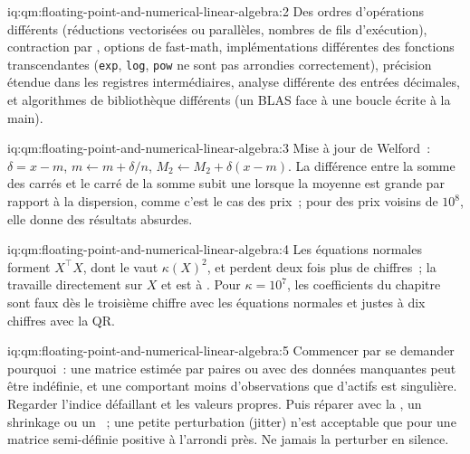 \begin{solution}{iq:qm:floating-point-and-numerical-linear-algebra:2}
Des ordres d'opérations différents (réductions vectorisées ou parallèles, nombres de fils d'exécution), contraction par , options de fast-math, implémentations différentes des fonctions transcendantes (\texttt{exp}, \texttt{log},
\texttt{pow} ne sont pas arrondies correctement), précision étendue dans les registres intermédiaires, analyse différente des entrées décimales, et algorithmes de bibliothèque différents (un BLAS face à une boucle écrite à la main).
\end{solution}

\begin{solution}{iq:qm:floating-point-and-numerical-linear-algebra:3}
Mise à jour de Welford~: $\delta = x - m$, $m \leftarrow m + \delta/n$, $M_2 \leftarrow M_2 + \delta(x - m)$. La différence entre la somme des carrés et le carré de la somme subit une  lorsque la moyenne est grande
par rapport à la dispersion, comme c'est le cas des prix~; pour des prix voisins de $10^8$, elle donne des résultats absurdes.
\end{solution}

\begin{solution}{iq:qm:floating-point-and-numerical-linear-algebra:4}
Les équations normales forment $X^\top X$, dont le  vaut $\kappa(X)^2$, et perdent deux fois plus de chiffres~; la  travaille directement sur $X$ et est à . Pour $\kappa = 10^7$, les coefficients du chapitre
sont faux dès le troisième chiffre avec les équations normales et justes à dix chiffres avec la QR.
\end{solution}

\begin{solution}{iq:qm:floating-point-and-numerical-linear-algebra:5}
Commencer par se demander pourquoi~: une matrice estimée par paires ou avec des données manquantes peut être indéfinie, et une  comportant moins d'observations que d'actifs est singulière. Regarder l'indice défaillant et les
valeurs propres. Puis réparer avec la , un shrinkage ou un ~; une petite perturbation (jitter) n'est acceptable que pour une matrice semi-définie positive à l'arrondi près. Ne jamais
la perturber en silence.
\end{solution}

